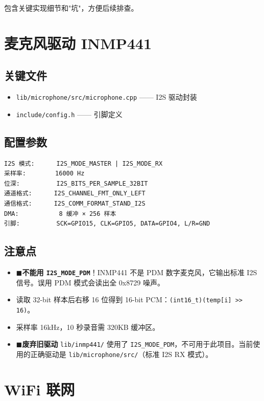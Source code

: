 \documentclass[12pt,a4paper,openany]{ctexbook}
\newcommand{\taskfail}{{\color{accent}$\blacksquare$}}
\begin{document}
包含关键实现细节和"坑"，方便后续排查。

\section{麦克风驱动 INMP441}

\subsection*{关键文件}
\begin{itemize}
    \item \texttt{lib/microphone/src/microphone.cpp} —— I2S 驱动封装
    \item \texttt{include/config.h} —— 引脚定义
\end{itemize}

\subsection*{配置参数}
\begin{verbatim}
I2S 模式:      I2S_MODE_MASTER | I2S_MODE_RX
采样率:        16000 Hz
位深:          I2S_BITS_PER_SAMPLE_32BIT
通道格式:      I2S_CHANNEL_FMT_ONLY_LEFT
通信格式:      I2S_COMM_FORMAT_STAND_I2S
DMA:           8 缓冲 × 256 样本
引脚:          SCK=GPIO15, CLK=GPIO5, DATA=GPIO4, L/R=GND
\end{verbatim}

\subsection*{注意点}
\begin{itemize}
    \item \taskfail \textbf{不能用 \texttt{I2S\_MODE\_PDM}}！INMP441 不是 PDM 数字麦克风，它输出标准 I2S 信号。误用 PDM 模式会读出全 0x8729 噪声。
    \item 读取 32-bit 样本后右移 16 位得到 16-bit PCM：\texttt{(int16\_t)(temp[i] >> 16)}。
    \item 采样率 16kHz，10 秒录音需 320KB 缓冲区。
    \item \taskfail \textbf{废弃旧驱动} \texttt{lib/inmp441/} 使用了 \texttt{I2S\_MODE\_PDM}，不可用于此项目。当前使用的正确驱动是 \texttt{lib/microphone/src/}（标准 I2S RX 模式）。
\end{itemize}

\section{WiFi 联网}
\end{document}
